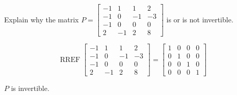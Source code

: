 
\begin{exerciseStatement}


Explain why the matrix \(P= \left[\begin{array}{cccc}
-1 & 1 & 1 & 2 \\
-1 & 0 & -1 & -3 \\
-1 & 0 & 0 & 0 \\
2 & -1 & 2 & 8
\end{array}\right] \) is or is not invertible.


\end{exerciseStatement}
    
\begin{exerciseAnswer} 


\[\operatorname{RREF} \left[\begin{array}{cccc}
-1 & 1 & 1 & 2 \\
-1 & 0 & -1 & -3 \\
-1 & 0 & 0 & 0 \\
2 & -1 & 2 & 8
\end{array}\right] = \left[\begin{array}{cccc}
1 & 0 & 0 & 0 \\
0 & 1 & 0 & 0 \\
0 & 0 & 1 & 0 \\
0 & 0 & 0 & 1
\end{array}\right] \]

\(P\) is invertible.
\end{exerciseAnswer}
    
